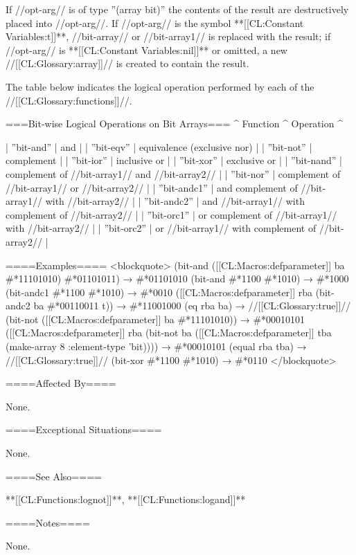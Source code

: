 If //opt-arg// is of type ''(array bit)'' the contents of the result are destructively placed into //opt-arg//. If //opt-arg// is the symbol **[[CL:Constant Variables:t]]**, //bit-array// or //bit-array1// is replaced with the result; if //opt-arg// is **[[CL:Constant Variables:nil]]** or omitted, a new //[[CL:Glossary:array]]// is created to contain the result.

The table below indicates the logical operation performed by each of the //[[CL:Glossary:functions]]//.

===Bit-wise Logical Operations on Bit Arrays=== ^ Function ^ Operation ^

| ''bit-and'' | and | | ''bit-eqv'' | equivalence (exclusive nor) | | ''bit-not'' | complement | | ''bit-ior'' | inclusive or | | ''bit-xor'' | exclusive or | | ''bit-nand'' | complement of //bit-array1// and //bit-array2// | | ''bit-nor'' | complement of //bit-array1// or //bit-array2// | | ''bit-andc1'' | and complement of //bit-array1// with //bit-array2// | | ''bit-andc2'' | and //bit-array1// with complement of //bit-array2// | | ''bit-orc1'' | or complement of //bit-array1// with //bit-array2// | | ''bit-orc2'' | or //bit-array1// with complement of //bit-array2// |

====Examples==== <blockquote> (bit-and ([[CL:Macros:defparameter]] ba #*11101010) #*01101011) → #*01101010 (bit-and #*1100 #*1010) → #*1000 (bit-andc1 #*1100 #*1010) → #*0010 ([[CL:Macros:defparameter]] rba (bit-andc2 ba #*00110011 t)) → #*11001000 (eq rba ba) → //[[CL:Glossary:true]]// (bit-not ([[CL:Macros:defparameter]] ba #*11101010)) → #*00010101 ([[CL:Macros:defparameter]] rba (bit-not ba ([[CL:Macros:defparameter]] tba (make-array 8 :element-type 'bit)))) → #*00010101 (equal rba tba) → //[[CL:Glossary:true]]// (bit-xor #*1100 #*1010) → #*0110 </blockquote>

====Affected By====

None.

====Exceptional Situations====

None.

====See Also====

**[[CL:Functions:lognot]]**, **[[CL:Functions:logand]]**

====Notes====

None.

